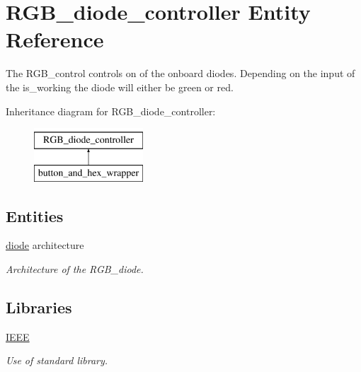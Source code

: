 \hypertarget{classRGB__diode__controller}{\section{R\-G\-B\-\_\-diode\-\_\-controller Entity Reference}
\label{classRGB__diode__controller}
}


The R\-G\-B\-\_\-control controls on of the onboard diodes. Depending on the input of the is\-\_\-working the diode will either be green or red.  


Inheritance diagram for R\-G\-B\-\_\-diode\-\_\-controller\-:\begin{figure}[H]
\begin{center}
\leavevmode
\includegraphics[height=2.000000cm]{classRGB__diode__controller}
\end{center}
\end{figure}
\subsection*{Entities}
\begin{DoxyCompactItemize}
\item 
\hyperlink{classRGB__diode__controller_1_1diode}{diode} architecture
\begin{DoxyCompactList}\small\item\em Architecture of the R\-G\-B\-\_\-diode. \end{DoxyCompactList}\end{DoxyCompactItemize}
\subsection*{Libraries}
 \begin{DoxyCompactItemize}
\item 
\hypertarget{classRGB__diode__controller_ae4f03c286607f3181e16b9aa12d0c6d4}{\hyperlink{classRGB__diode__controller_ae4f03c286607f3181e16b9aa12d0c6d4}{I\-E\-E\-E} }\label{classRGB__diode__controller_ae4f03c286607f3181e16b9aa12d0c6d4}

\begin{DoxyCompactList}\small\item\em Use of standard library. \end{DoxyCompactList}\end{DoxyCompactItemize}
